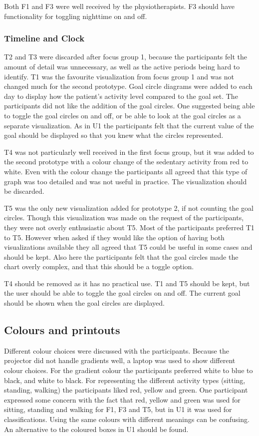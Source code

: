 Both F1 and F3 were well received by the physiotherapists. F3 should have functionality for toggling nighttime on and off.

\subsubsection{Timeline and Clock}
T2 and T3 were discarded after focus group 1, because the participants felt the amount of detail was unnecessary, as well as the active periods being hard to identify. T1 was the favourite visualization from focus group 1 and was not changed much for the second prototype. Goal circle diagrams were added to each day to display how the patient's activity level compared to the goal set. The participants did not like the addition of the goal circles. One suggested being able to toggle the goal circles on and off, or be able to look at the goal circles as a separate visualization. As in U1 the participants felt that the current value of the goal should be displayed so that you knew what the circles represented.

T4 was not particularly well received in the first focus group, but it was added to the second prototype with a colour change of the sedentary activity from red to white. Even with the colour change the participants all agreed that this type of graph was too detailed and was not useful in practice. The visualization should be discarded.

T5 was the only new visualization added for prototype 2, if not counting the goal circles. Though this visualization was made on the request of the participants, they were not overly enthusiastic about T5. Most of the participants preferred T1 to T5. However when asked if they would like the option of having both visualizations available they all agreed that T5 could be useful in some cases and should be kept. Also here the participants felt that the goal circles made the chart overly complex, and that this should be a toggle option.

T4 should be removed as it has no practical use. T1 and T5 should be kept, but the user should be able to toggle the goal circles on and off. The current goal should be shown when the goal circles are displayed. 

\subsection{Colours and printouts}
Different colour choices were discussed with the participants. Because the projector did not handle gradients well, a laptop was used to show different colour choices. For the gradient colour the participants preferred white to blue to black, and white to black. For representing the different activity types (sitting, standing, walking) the participants liked red, yellow and green. One participant expressed some concern with the fact that red, yellow and green was used for sitting, standing and walking for F1, F3 and T5, but in U1 it was used for classifications. Using the same colours with different meanings can be confusing. An alternative to the coloured boxes in U1 should be found.

